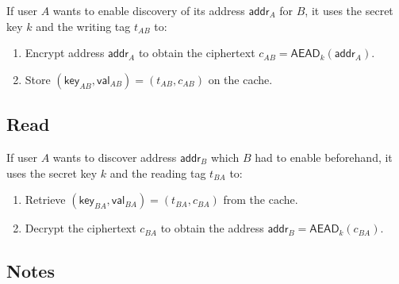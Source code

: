 \documentclass[11pt,letterpaper]{article}
\theoremstyle{definition}
\newcommand{\key}{\mathsf{key}}
\newcommand{\val}{\mathsf{val}}
\newcommand{\addr}{\mathsf{addr}}
\newcommand{\aead}{\mathsf{AEAD}}
\begin{document}
If user $A$ wants to enable discovery of its address $\addr_A$ for $B$, it uses
the secret key $k$ and the writing tag $t_{AB}$ to:

\begin{enumerate}

  \item Encrypt address $\addr_A$ to obtain the ciphertext $c_{AB} = \aead_{k}(\addr_A)$.

  \item Store $(\key_{AB}, \val_{AB}) = (t_{AB}, c_{AB})$ on the cache.

\end{enumerate}



\subsection{Read}\label{sec:read}

If user $A$ wants to discover address $\addr_B$ which $B$ had to enable
beforehand, it uses the secret key $k$ and the reading tag $t_{BA}$ to:

\begin{enumerate}

  \item Retrieve $(\key_{BA}, \val_{BA}) = (t_{BA}, c_{BA})$ from the cache.

  \item Decrypt the ciphertext $c_{BA}$ to obtain the address $\addr_B =
          \aead_{k}(c_{BA})$.

\end{enumerate}



\subsection{Notes}
\end{document}

